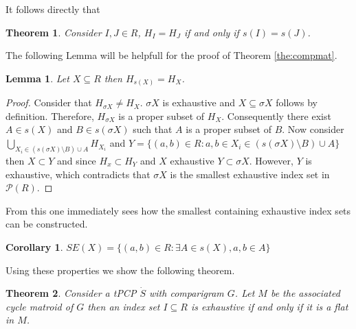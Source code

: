 \documentclass[a4paper,12pt]{article}
\newtheorem{theorem}{Theorem}
\newtheorem{corollary}{Corollary}
\newtheorem{lemma}{Lemma}
\begin{document}
It follows directly that 

\begin{theorem}
  Consider $I, J \in R$, $H_I = H_J$ if and only if $s(I) = s(J)$. 
\end{theorem}

The following Lemma will be helpfull for the proof of Theorem
\ref{the:compmat}. 

\begin{lemma}
  Let $X \subseteq R$ then $H_{s(X)} = H_X$. 
\end{lemma}

\begin{proof}
  Consider that $H_{\sigma X} \neq H_X$. $\sigma X$ is exhaustive and
  $X \subseteq \sigma X$ follows by definition. Therefore, $H_{\sigma
    X}$ is a proper subset of $H_X$. Consequently there exist $A \in
  s(X)$ and $B \in s(\sigma X)$ such that $A$ is a proper subset of
  $B$. Now consider $\bigcup_{X_i \in (s(\sigma X)\setminus B)\cup A}
  H_{X_i}$ and $Y = \{(a,b) \in R: a,b \in X_i \in (s(\sigma
  X)\setminus B)\cup A\}$ then $X \subset Y$ and since $H_x \subset
  H_Y$ and $X$ exhaustive $Y \subset \sigma X$. However, $Y$ is
  exhaustive, which contradicts that $\sigma X$ is the smallest
  exhaustive index set in $\mathcal{P}(R)$.
\end{proof}

From this one immediately sees how the smallest containing exhaustive
index sets can be constructed.

\begin{corollary}
  $SE(X) = \{(a,b) \in R:\exists A \in s(X), a,b \in A\}$
\end{corollary}


Using these properties we show the following theorem. 

\begin{theorem}
  Consider a tPCP $\dot{S}$ with comparigram $G$. Let $M$ be the
  associated cycle matroid of $G$ then an index set $I \subseteq R$ is
  exhaustive if and only if it is a flat in $M$.
\end{theorem}
\end{document}
